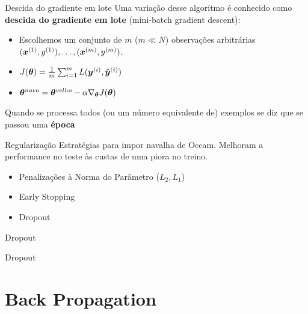 \documentclass[10pt]{beamer}
\begin{document}
\begin{frame}[fragile]{Descida do gradiente em lote}
Uma variação desse algoritmo é conhecido como \textbf{descida do gradiente em lote} (\alert{mini-batch gradient descent}):

\begin{itemize}
\item Escolhemos um conjunto de $m$ ($m \ll N$) observações arbitrárias $(\bm{x}^{(1)},y^{(1)}), \dots, (\bm{x}^{(m)},y^{(m)})$.
\vspace{0.3cm}
\item $J(\bm{\theta}) =  \frac{1}{m}\sum_{i=1}^{m} L(\bm{y}^{(i)}, {\hat{\bm{y}}}^{(i)})$
\vspace{0.3cm}
\item $\bm{\theta}^{novo} = \bm{\theta}^{velho} - \alpha \nabla_{\bm{\theta}} {J(\bm{\theta})}$
\end{itemize}
Quando se processa todos (ou um número equivalente de) exemplos se diz que se passou uma \textbf{época}
\end{frame}

\begin{frame}[fragile]{Regularização}
Estratégias para impor navalha de Occam. Melhoram a performance no teste às custas de uma piora no treino.
\vspace{0.3cm}
\begin{itemize}
	\item Penalizações à Norma do Parâmetro ($L_2, L_1$)\\
    \vspace{0.3cm}
    \item Early Stopping
    \vspace{0.3cm}
    \item Dropout
    
\end{itemize}
\end{frame}

\begin{frame}[fragile]{Dropout}

\end{frame}

\begin{frame}[fragile]{Dropout}

\end{frame}

\section{Back Propagation}
\end{document}
